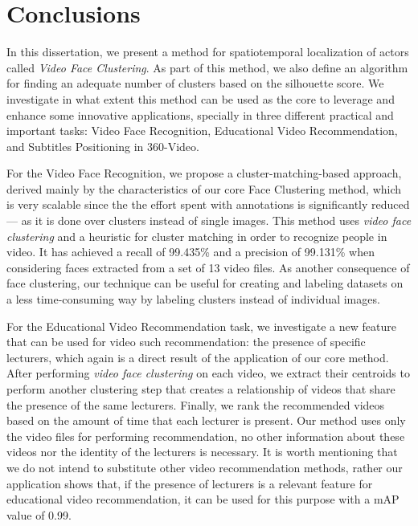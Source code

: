 \newpage

\chapter{Conclusions}
\label{chap:conclusions}

In this dissertation, we present a method for spatiotemporal localization of actors called \emph{Video Face Clustering}. As part of this method, we also define an algorithm for finding an adequate number of clusters based on the silhouette score. We investigate in what extent this method can be used as the core to leverage and enhance some innovative applications, specially in three different  practical and important tasks: Video Face Recognition, Educational Video Recommendation, and Subtitles Positioning in 360-Video.

For the Video Face Recognition, we propose a cluster-matching-based approach, derived mainly by the characteristics of our core Face Clustering method, which is very scalable since the the effort spent with annotations is significantly reduced --- as it is done over clusters instead of single images. This method uses \emph{video face clustering} and a heuristic for cluster matching in order to recognize people in video. It has achieved a recall of 99.435\% and a precision of 99.131\% when considering faces extracted from a set of 13 video files. As another consequence of face clustering, our technique can be useful for creating and labeling datasets on a less time-consuming way by labeling clusters instead of individual images.

For the Educational Video Recommendation task, we investigate a new feature that can be used for video such recommendation: the presence of specific lecturers, which again is a direct result of the application of our core method. After performing \emph{video face clustering} on each video, we extract their centroids to perform another clustering step that creates a relationship of videos that share the presence of the same lecturers. Finally, we rank the recommended videos based on the amount of time that each lecturer is present. Our method uses only the video files for performing recommendation, no other information about these videos nor the identity of the lecturers is necessary. It is worth mentioning that we do not intend to substitute other video recommendation methods, rather our application shows that, if the presence of lecturers is a relevant feature for educational video recommendation, it can be used for this purpose with a mAP value of 0.99.

